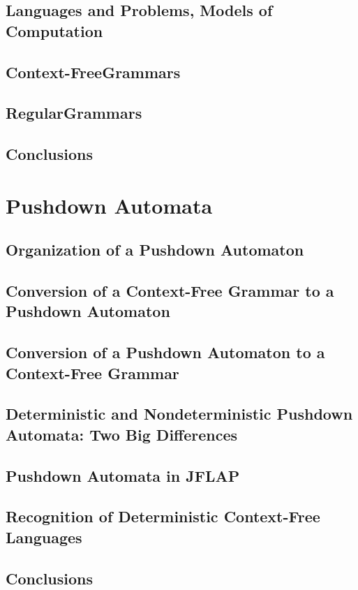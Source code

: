 \documentclass[a4paper]{article}
\begin{document}
\subsection{Languages and Problems, Models of Computation}
\subsection{Context-FreeGrammars}
\subsection{RegularGrammars}
\subsection{Conclusions}

\newpage
\section{Pushdown Automata}
\subsection{Organization of a Pushdown Automaton}
\subsection{Conversion of a Context-Free Grammar to a Pushdown Automaton}
\subsection{Conversion of a Pushdown Automaton to a Context-Free Grammar}
\subsection{Deterministic and Nondeterministic Pushdown Automata: Two Big Differences}
\subsection{Pushdown Automata in JFLAP}
\subsection{Recognition of Deterministic Context-Free Languages}
\subsection{Conclusions}
\end{document}
